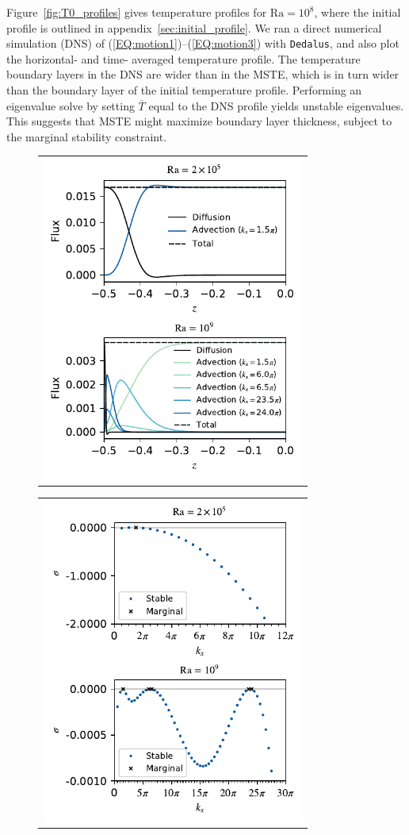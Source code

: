 \documentclass[reprint,amsmath,amssymb,aps,nofootinbib]{revtex4-1}
\newcommand\Ra{\mathrm{Ra}}
\newcommand{\eqss}[2]{(\ref{#1})--(\ref{#2})}
\begin{document}
Figure~\ref{fig:T0_profiles} gives temperature profiles for $\Ra = 10^8$, where the initial profile is outlined in appendix~\ref{sec:initial_profile}. 
We ran a direct numerical simulation (DNS) of \eqss{EQ:motion1}{EQ:motion3} with \texttt{Dedalus}, and also plot the horizontal- and time- averaged temperature profile. 
The temperature boundary layers in the DNS are wider than in the MSTE, which is in turn wider than the boundary layer of the initial temperature profile.
Performing an eigenvalue solve by setting $\overline{T}$ equal to the DNS profile yields unstable eigenvalues. 
This suggests that MSTE might maximize boundary layer thickness, subject to the marginal stability constraint.

\begin{figure}
    \centering
    \begin{tabular}{@{}c@{}}
        \includegraphics[width=3.4in]{flux_sup_n.pdf}
    \end{tabular}
    \begin{tabular}{@{}c@{}}
        \includegraphics[width=3.4in]{EV_spectra_2ra.pdf}

\end{tabular}
\end{figure}
\end{document}
